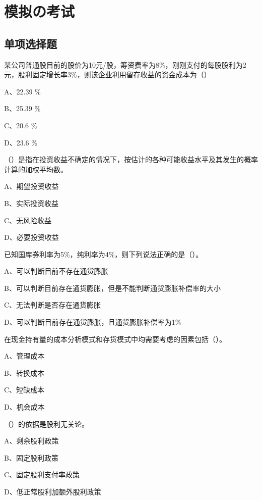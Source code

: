 \documentclass[
  10pt,
  twoside,
  openany,
  b5paper, %
  colorscheme = black, %
  xits = false,
]{qyxf-book}
\begin{document}
\chapter{模拟の考试}
\section{单项选择题}
 某公司普通股目前的股价为10元/股，筹资费率为8\%，刚刚支付的每股股利为2元，股利固定增长率3\%，则该企业利用留存收益的资金成本为（\qquad）

A、22.39 \%

B、25.39 \%

C、20.6 \%

D、23.6 \%

 （\qquad）是指在投资收益不确定的情况下，按估计的各种可能收益水平及其发生的概率计算的加权平均数。

A、期望投资收益

B、实际投资收益

C、无风险收益

D、必要投资收益

 已知国库券利率为5\%，纯利率为4\%，则下列说法正确的是（\qquad）。

A、可以判断目前不存在通货膨胀

B、可以判断目前存在通货膨胀，但是不能判断通货膨胀补偿率的大小

C、无法判断是否存在通货膨胀

D、可以判断目前存在通货膨胀，且通货膨胀补偿率为1\%

 在现金持有量的成本分析模式和存货模式中均需要考虑的因素包括（\qquad）。

A、管理成本

B、转换成本

C、短缺成本

D、机会成本

 （\qquad）的依据是股利无关论。

A、剩余股利政策

B、固定股利政策

C、固定股利支付率政策

D、低正常股利加额外股利政策
\end{document}
